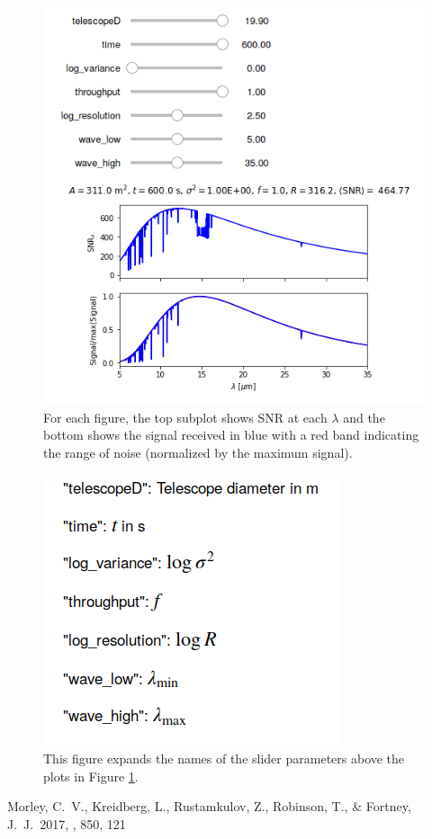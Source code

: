 \documentclass{knac}
\begin{document}
\begin{figure}
\begin{minipage}{0.33\textwidth}
    \end{minipage}
    \begin{minipage}{0.33\textwidth}
        \centering
        \includegraphics[width=1.0\linewidth]{widget_3.png}
    \end{minipage}
    \caption{For each figure, the top subplot shows SNR at each $\lambda$ and the bottom shows the signal received in blue with a red band indicating the range of noise (normalized by the maximum signal).}
    \label{figure:widget_all}
\end{figure}

\begin{figure}[h!]
\centering
\includegraphics[scale=0.6]{widget_slider.png}
\caption{This figure expands the names of the slider parameters above the plots in Figure \ref{figure:widget_all}.}
\label{figure:widget_slider}
\end{figure}


\begin{thebibliography}{}

 Morley, C.~V., Kreidberg, L., Rustamkulov, Z., Robinson, T., \& Fortney, J.~J.\ 2017, \apj, 850, 121 

\end{thebibliography}
\end{document}
